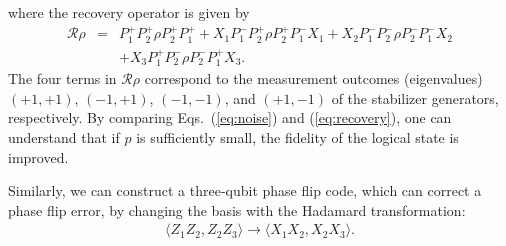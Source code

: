 %
where the recovery operator is given by
%
\begin{eqnarray}
\mathcal{R} \rho &=& P_{1}^{+}P_{2}^{+} \rho P_{2}^{+}P_{1}^{+}+X_{1} P_{1}^{-}P_{2}^{+} \rho P_{2}^{+}P_{1}^{-} X_{1}+X_{2} P_{1}^{-}P_{2}^{-} \rho P_{2}^{-}P_{1}^{-} X_{2}
\nonumber \\
&&+X_{3} P_{1}^{+}P_{2}^{-} \rho P_{2}^{-}P_{1}^{+} X_{3}.
\end{eqnarray}
%
The four terms in $\mathcal{R}\rho$ correspond to the measurement outcomes (eigenvalues) $(+1,+1)$, $(-1,+1)$, $(-1,-1)$, and $(+1,-1)$
of the stabilizer generators, respectively.
By comparing Eqs.\ (\ref{eq:noise}) and (\ref{eq:recovery}), one can understand that if $p$ is sufficiently small, the fidelity of the logical state is improved.

Similarly, we can construct a three-qubit phase flip code, which can correct a phase flip error, by changing the basis with the Hadamard transformation:
\begin{eqnarray}
\langle Z_1 Z_2, Z_2 Z_3 \rangle \rightarrow \langle X_1 X_2 , X_2 X_3 \rangle.  
\end{eqnarray}

